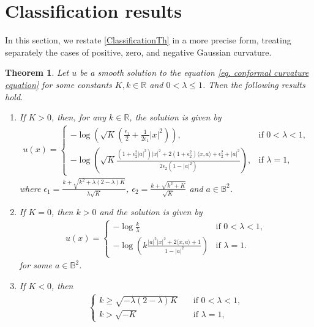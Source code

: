 \documentclass[11pt,a4paper,twoside]{amsart}
\newtheorem{theorem}{Theorem} [section]
\newtheorem{sketch proof}{Sketch of the proof}[section]
\begin{document}
\section{Classification results}\label{Class section}
In this section, we restate \cref{ClassificationTh} in a more precise form, treating separately the cases of positive, zero, and negative Gaussian curvature.
\begin{theorem}
    Let $u$ be a smooth solution to the equation
    \cref{eq. conformal curvature equation}
for some constants $K,k\in \mathbb{R}$ and  $0< \lambda\leq 1$. Then the following results hold.
\begin{enumerate}
     \item If $K>0$, 
        then, for any $k\in\mathbb{R}$, the solution is given by
        \begin{align*}
    u(x)=
    \begin{cases}
        -\log\left(\sqrt{K}
    \left(\frac{\epsilon_1}{2}+\frac{1}{2\epsilon_1}|x|^2\right)
    \right),&\text{if }0<\lambda<1,\\[3mm]
    \displaystyle{-\log\left(
    \sqrt{K}
    \frac{(1+\epsilon_2^2|a|^2)|x|^2
    +2(1+\epsilon_2^2)\langle x,a\rangle
    +\epsilon_2^2+|a|^2}{2\epsilon_2(1-|a|^2)}
    \right)}, &\text{if }\lambda=1,
    \end{cases}
        \end{align*}
where $\epsilon_1=\frac{k+\sqrt{k^2+\lambda(2-\lambda)K}}{\lambda\sqrt{K}}$, $\epsilon_2=\frac{k+\sqrt{k^2+K}}{\sqrt{K}}$ and $a\in\mathbb{B}^2$.
        \item If $K=0$, then $k>0$ and the solution is given by
        \begin{align*}
            u(x)=
            \begin{cases}
            -\log\frac{k}{\lambda} &\text{if }0<\lambda<1,\\[3mm]
                \displaystyle{-\log\left(
                k\frac{|a|^2|x|^2+2\langle x,a\rangle+1}{1-|a|^2}
                \right)} & \text{if }\lambda=1.
            \end{cases}
        \end{align*}
        for some $a\in \mathbb{B}^2$.
        \item If $K<0$, then 
        \begin{align*}
        \begin{cases}
            k\geq \sqrt{-\lambda(2-\lambda)K} \quad&\text{if }0<\lambda<1,\\[2mm]
            k>\sqrt{-K} &\text{if }\lambda=1,

\end{cases}
\end{align*}
\end{enumerate}
\end{theorem}
\end{document}
